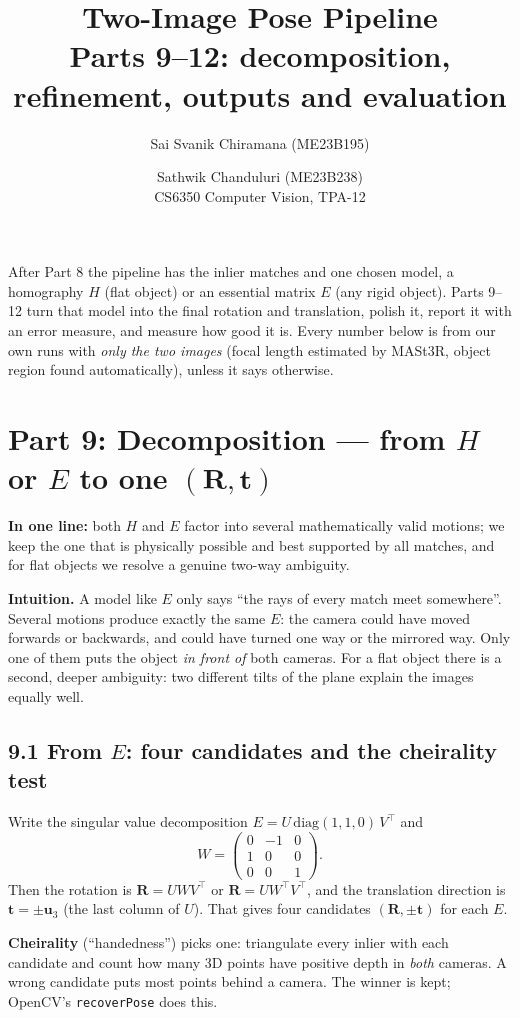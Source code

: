 \documentclass[11pt,a4paper]{article}
\title{Two-Image Pose Pipeline\\[2pt]\large Parts 9--12: decomposition, refinement, outputs and evaluation}
\author{Sai Svanik Chiramana (ME23B195) \and Sathwik Chanduluri (ME23B238)\\[2pt]\small CS6350 Computer Vision, TPA-12}
\date{}
\newcommand{\R}{\mathbf{R}}
\newcommand{\tv}{\mathbf{t}}
\newcommand{\intuition}[1]{\par\noindent\textbf{Intuition.} #1\par\medskip}
\begin{document}
\maketitle

\noindent After Part 8 the pipeline has the inlier matches and one chosen model, a homography $H$ (flat object) or an essential matrix $E$ (any rigid object). Parts 9--12 turn that model into the final rotation and translation, polish it, report it with an error measure, and measure how good it is. Every number below is from our own runs with \emph{only the two images} (focal length estimated by MASt3R, object region found automatically), unless it says otherwise.

\section*{Part 9: Decomposition --- from $H$ or $E$ to one $(\R,\tv)$}

\textbf{In one line:} both $H$ and $E$ factor into several mathematically valid motions; we keep the one that is physically possible and best supported by all matches, and for flat objects we resolve a genuine two-way ambiguity.

\intuition{A model like $E$ only says ``the rays of every match meet somewhere''. Several motions produce exactly the same $E$: the camera could have moved forwards or backwards, and could have turned one way or the mirrored way. Only one of them puts the object \emph{in front of} both cameras. For a flat object there is a second, deeper ambiguity: two different tilts of the plane explain the images equally well.}

\subsection*{9.1 From $E$: four candidates and the cheirality test}
Write the singular value decomposition $E = U\,\mathrm{diag}(1,1,0)\,V^\top$ and
\[
W=\begin{pmatrix}0&-1&0\\1&0&0\\0&0&1\end{pmatrix}.
\]
Then the rotation is $\R = UWV^\top$ or $\R = UW^\top V^\top$, and the translation direction is $\tv=\pm\mathbf{u}_3$ (the last column of $U$). That gives four candidates $(\R,\pm\tv)$ for each $E$.

\textbf{Cheirality} (``handedness'') picks one: triangulate every inlier with each candidate and count how many 3D points have positive depth in \emph{both} cameras. A wrong candidate puts most points behind a camera. The winner is kept; OpenCV's \texttt{recoverPose} does this.
\end{document}
